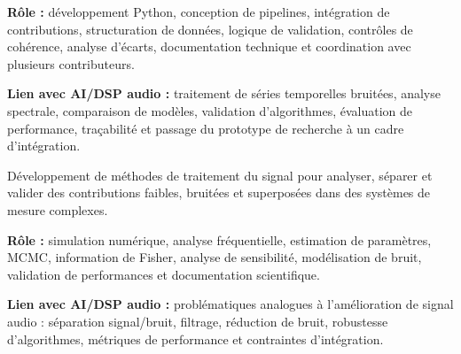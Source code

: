 \documentclass[8pt,a4paper,ragged2e,withhyper]{../_shared/altacv}
\begin{document}
\textbf{Rôle :} développement Python, conception de pipelines, intégration de contributions, structuration de données, logique de validation, contrôles de cohérence, analyse d’écarts, documentation technique et coordination avec plusieurs contributeurs.

\textbf{Lien avec AI/DSP audio :} traitement de séries temporelles bruitées, analyse spectrale, comparaison de modèles, validation d’algorithmes, évaluation de performance, traçabilité et passage du prototype de recherche à un cadre d’intégration.

\divider


Développement de méthodes de traitement du signal pour analyser, séparer et valider des contributions faibles, bruitées et superposées dans des systèmes de mesure complexes.

\textbf{Rôle :} simulation numérique, analyse fréquentielle, estimation de paramètres, MCMC, information de Fisher, analyse de sensibilité, modélisation de bruit, validation de performances et documentation scientifique.

\textbf{Lien avec AI/DSP audio :} problématiques analogues à l’amélioration de signal audio : séparation signal/bruit, filtrage, réduction de bruit, robustesse d’algorithmes, métriques de performance et contraintes d’intégration.


\vspace{-.3cm}


{\small
{}
}

\divider\smallskip
\vspace{-.3cm}

\end{document}
